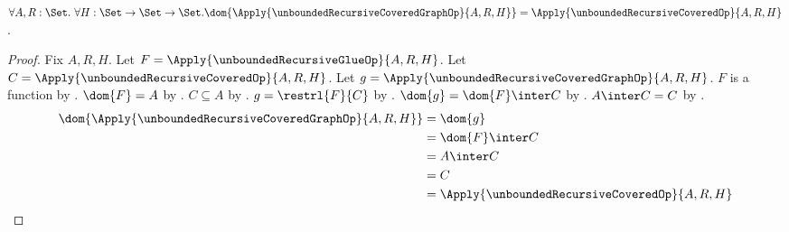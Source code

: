 \begin{proposition}\label{unbounded_recursive_covered_graph_domain}
    $\forall A,R:\Set.\ \forall H:\Set\to\Set\to\Set.
        \dom{
            \Apply{\unboundedRecursiveCoveredGraphOp}
                {A,R,H}}
        =\Apply{\unboundedRecursiveCoveredOp}
            {A,R,H}$.
\end{proposition}
\begin{proof}
    Fix $A,R,H$.
    Let $F=\Apply{\unboundedRecursiveGlueOp}
        {A,R,H}$.
    Let $C=\Apply{\unboundedRecursiveCoveredOp}
        {A,R,H}$.
    Let $g=\Apply{\unboundedRecursiveCoveredGraphOp}
        {A,R,H}$.
    $F$ is a function by
        .
    $\dom{F}=A$ by .
    $C\subseteq A$ by .
    $g=\restrl{F}{C}$ by
        .
    $\dom{g}=\dom{F}\inter C$ by
        .
    $A\inter C=C$ by .
    \begin{align*}
        \dom{\Apply{\unboundedRecursiveCoveredGraphOp}{A,R,H}}
            &= \dom{g}
            \\
            &= \dom{F}\inter C
            \\
            &= A\inter C
            \\
            &= C
            \\
            &= \Apply{\unboundedRecursiveCoveredOp}{A,R,H}
    \end{align*}
\end{proof}

